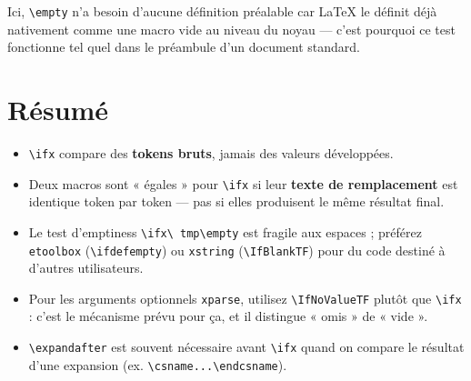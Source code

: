 \documentclass{article}
\begin{document}
\noindent
Ici, \texttt{\textbackslash empty} n'a besoin d'aucune définition préalable
car \LaTeX{} le définit déjà nativement comme une macro vide au niveau du
noyau — c'est pourquoi ce test fonctionne tel quel dans le préambule d'un
document standard.

\section{Résumé}
\begin{itemize}
  \item \texttt{\textbackslash ifx} compare des \textbf{tokens bruts}, jamais
  des valeurs développées.
  \item Deux macros sont « égales » pour \texttt{\textbackslash ifx} si leur
  \textbf{texte de remplacement} est identique token par token --- pas si
  elles produisent le même résultat final.
  \item Le test d'emptiness \texttt{\textbackslash ifx\textbackslash
  tmp\textbackslash empty} est fragile aux espaces ; préférez
  \texttt{etoolbox} (\texttt{\textbackslash ifdefempty}) ou \texttt{xstring}
  (\texttt{\textbackslash IfBlankTF}) pour du code destiné à d'autres
  utilisateurs.
  \item Pour les arguments optionnels \texttt{xparse}, utilisez
  \texttt{\textbackslash IfNoValueTF} plutôt que \texttt{\textbackslash ifx} :
  c'est le mécanisme prévu pour ça, et il distingue « omis » de « vide ».
  \item \texttt{\textbackslash expandafter} est souvent nécessaire avant
  \texttt{\textbackslash ifx} quand on compare le résultat d'une expansion
  (ex. \texttt{\textbackslash csname...\textbackslash endcsname}).
\end{itemize}
\end{document}
